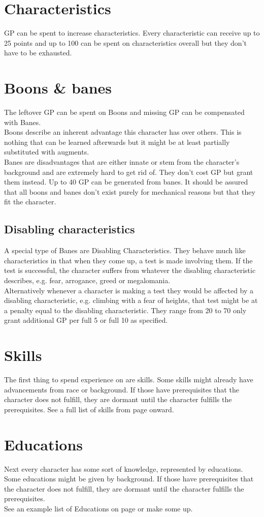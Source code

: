 \documentclass[12pt,a4paper,openany]{book}
\begin{document}
	\section{Characteristics}
	GP can be spent to increase characteristics. Every characteristic can receive up to 25 points and up to 100 can be spent on characteristics overall but they don’t have to be exhausted.
	\section{Boons \& banes}
	The leftover GP can be spent on Boons and missing GP can be compensated with Banes.\\
	Boons describe an inherent advantage this character has over others. This is nothing that can be learned afterwards but it might be at least partially substituted with augments.\\
	Banes are disadvantages that are either innate or stem from the character’s background and are extremely hard to get rid of. They don’t cost GP but grant them instead. Up to 40 GP can be generated from banes. It should be assured that all boons and banes don’t exist purely for mechanical reasons but that they fit the character.
	\subsection{Disabling characteristics}
	A special type of Banes are Disabling Characteristics. They behave much like characteristics in that when they come up, a test is made involving them. If the test is successful, the character suffers from whatever the disabling characteristic describes, e.g. fear, arrogance, greed or megalomania.\\
	Alternatively whenever a character is making a test they would be affected by a disabling characteristic, e.g. climbing with a fear of heights, that test might be at a penalty equal to the disabling characteristic. They range from 20 to 70 only grant additional GP per full 5 or full 10 as specified.
	\section{Skills}
	The first thing to spend experience on are skills. Some skills might already have advancements from race or background. If those have prerequisites that the character does not fulfill, they are dormant until the character fulfills the prerequisites. See a full list of skills from page \pageref{skilllist} onward. 
	\section{Educations}
	Next every character has some sort of knowledge, represented by educations. Some educations might be given by background. If those have prerequisites that the character does not fulfill, they are dormant until the character fulfills the prerequisites.\\
	See an example list of Educations on page \pageref{eds-explanation} or make some up. 
\end{document}
